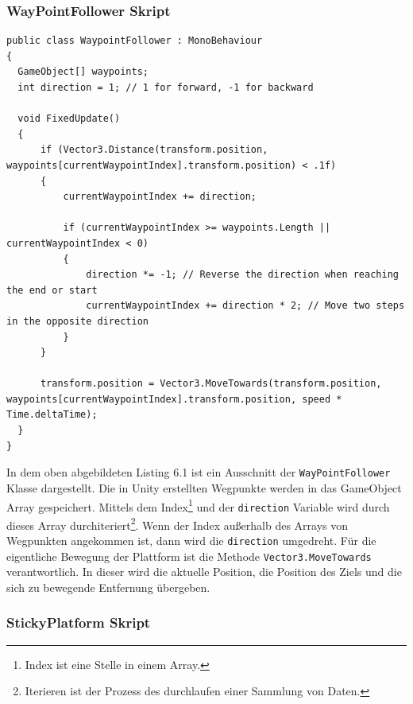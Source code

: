 \pagebreak

\subsubsection{WayPointFollower Skript}

\begin{lstlisting}[language=CSharp,caption={FixedUpdate der WayPointFollower Klasse.},label=code:mainmenu]
public class WaypointFollower : MonoBehaviour
{
  GameObject[] waypoints;
  int direction = 1; // 1 for forward, -1 for backward

  void FixedUpdate()
  {
      if (Vector3.Distance(transform.position, waypoints[currentWaypointIndex].transform.position) < .1f)
      {
          currentWaypointIndex += direction;

          if (currentWaypointIndex >= waypoints.Length || currentWaypointIndex < 0)
          {
              direction *= -1; // Reverse the direction when reaching the end or start
              currentWaypointIndex += direction * 2; // Move two steps in the opposite direction
          }
      }

      transform.position = Vector3.MoveTowards(transform.position, waypoints[currentWaypointIndex].transform.position, speed * Time.deltaTime);
  }
}
\end{lstlisting}

In dem oben abgebildeten Listing 6.1 ist ein Ausschnitt der \verb+WayPointFollower+ Klasse dargestellt. Die in Unity erstellten Wegpunkte werden in das GameObject Array gespeichert. Mittels dem Index\footnote[1]{Index ist eine Stelle in einem Array.} und der \verb+direction+ Variable wird durch dieses Array durchiteriert\footnote[2]{Iterieren ist der Prozess des durchlaufen einer Sammlung von Daten.}. Wenn der Index außerhalb des Arrays von Wegpunkten angekommen ist, dann wird die \verb+direction+ umgedreht. Für die eigentliche Bewegung der Plattform ist die Methode \verb+Vector3.MoveTowards+ verantwortlich. In dieser wird die aktuelle Position, die Position des Ziels und die sich zu bewegende Entfernung übergeben.


\pagebreak

\subsubsection{StickyPlatform Skript}

